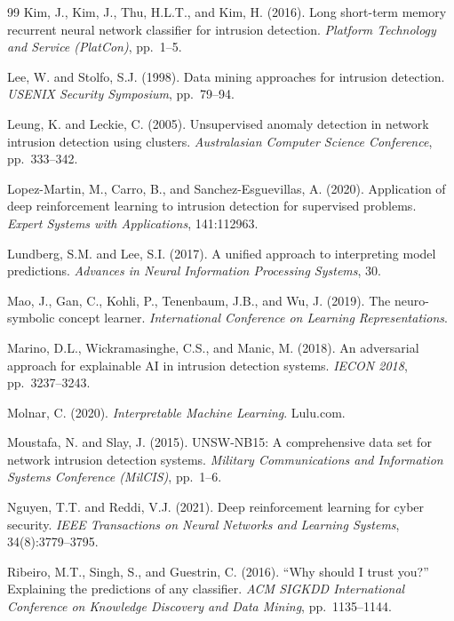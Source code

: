 \documentclass[12pt, letterpaper, oneside]{report}
\begin{document}
\begin{thebibliography}{99}
Kim, J., Kim, J., Thu, H.L.T., and Kim, H. (2016).
Long short-term memory recurrent neural network classifier for intrusion detection.
\textit{Platform Technology and Service (PlatCon)}, pp.\ 1--5.

Lee, W. and Stolfo, S.J. (1998).
Data mining approaches for intrusion detection.
\textit{USENIX Security Symposium}, pp.\ 79--94.

Leung, K. and Leckie, C. (2005).
Unsupervised anomaly detection in network intrusion detection using clusters.
\textit{Australasian Computer Science Conference}, pp.\ 333--342.

Lopez-Martin, M., Carro, B., and Sanchez-Esguevillas, A. (2020).
Application of deep reinforcement learning to intrusion detection for supervised problems.
\textit{Expert Systems with Applications}, 141:112963.

Lundberg, S.M. and Lee, S.I. (2017).
A unified approach to interpreting model predictions.
\textit{Advances in Neural Information Processing Systems}, 30.

Mao, J., Gan, C., Kohli, P., Tenenbaum, J.B., and Wu, J. (2019).
The neuro-symbolic concept learner.
\textit{International Conference on Learning Representations}.

Marino, D.L., Wickramasinghe, C.S., and Manic, M. (2018).
An adversarial approach for explainable AI in intrusion detection systems.
\textit{IECON 2018}, pp.\ 3237--3243.

Molnar, C. (2020).
\textit{Interpretable Machine Learning}. Lulu.com.

Moustafa, N. and Slay, J. (2015).
UNSW-NB15: A comprehensive data set for network intrusion detection systems.
\textit{Military Communications and Information Systems Conference (MilCIS)}, pp.\ 1--6.

Nguyen, T.T. and Reddi, V.J. (2021).
Deep reinforcement learning for cyber security.
\textit{IEEE Transactions on Neural Networks and Learning Systems}, 34(8):3779--3795.

Ribeiro, M.T., Singh, S., and Guestrin, C. (2016).
``Why should I trust you?'' Explaining the predictions of any classifier.
\textit{ACM SIGKDD International Conference on Knowledge Discovery and Data Mining}, pp.\ 1135--1144.


\end{thebibliography}
\end{document}

